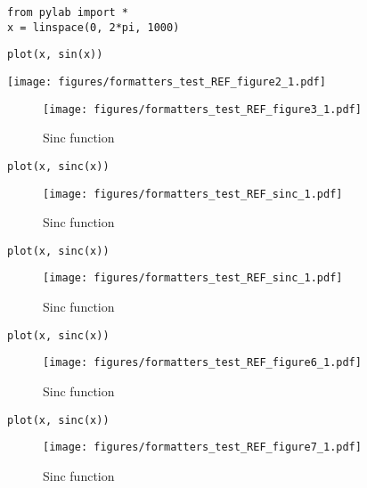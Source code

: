 

\begin{verbatim}
from pylab import *
x = linspace(0, 2*pi, 1000)
\end{verbatim}



\begin{verbatim}
plot(x, sin(x))
\end{verbatim}
\texttt{[image: figures/formatters\_test\_REF\_figure2\_1.pdf]}



\begin{figure}[htpb]
\center
\texttt{[image: figures/formatters\_test\_REF\_figure3\_1.pdf]}
\caption{Sinc function}
\label{fig:None}
\end{figure}



\begin{verbatim}
plot(x, sinc(x))
\end{verbatim}
\begin{figure}[htpb]
\center
\texttt{[image: figures/formatters\_test\_REF\_sinc\_1.pdf]}
\caption{Sinc function}
\label{fig:sinc}
\end{figure}



\begin{verbatim}
plot(x, sinc(x))
\end{verbatim}
\begin{figure}[htpb]
\center
\texttt{[image: figures/formatters\_test\_REF\_sinc\_1.pdf]}
\caption{Sinc function}
\label{fig:sinc}
\end{figure}



\begin{verbatim}
plot(x, sinc(x))
\end{verbatim}
\begin{figure}[htpb]
\center
\texttt{[image: figures/formatters\_test\_REF\_figure6\_1.pdf]}
\caption{Sinc function}
\label{fig:None}
\end{figure}



\begin{verbatim}
plot(x, sinc(x))
\end{verbatim}
\begin{sidefigure}
\begin{figure}[htpb]
\center
\texttt{[image: figures/formatters\_test\_REF\_figure7\_1.pdf]}
\caption{Sinc function}
\label{fig:None}
\end{figure}
\end{sidefigure}



